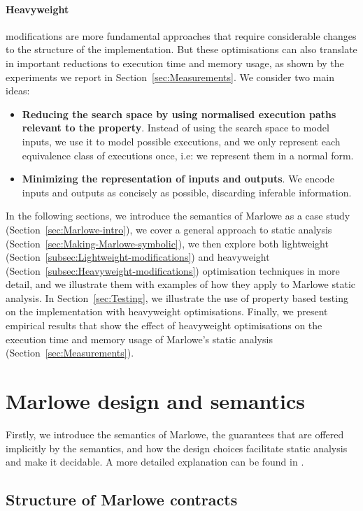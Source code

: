 \documentclass[english,runningheads]{llncs}
\begin{document}
\paragraph*{Heavyweight}

modifications are more fundamental approaches that require considerable
changes to the structure of the implementation. But these optimisations can also
translate in important reductions to execution time and memory usage, as
shown by the experiments we report in Section~\ref{sec:Measurements}.
We consider two main ideas:
\begin{itemize}
\item \textbf{Reducing the search space by using normalised execution paths relevant
to the property}. Instead of using the search space to model inputs, we
use it to model possible executions, and we only
represent each equivalence class of executions once, i.e:
we represent them in a normal form.
\item \textbf{Minimizing the representation of inputs and outputs}. We encode inputs
and outputs as concisely as possible, discarding inferable information.
\end{itemize}
In the following sections, we introduce the semantics of Marlowe as
a case study (Section~\ref{sec:Marlowe-intro}), we cover a
general approach to static analysis (Section~\ref{sec:Making-Marlowe-symbolic}),
we then explore both lightweight (Section~\ref{subsec:Lightweight-modifications})
and heavyweight (Section~\ref{subsec:Heavyweight-modifications})
optimisation techniques in more detail, and we illustrate them with
examples of how they apply to Marlowe static analysis. In Section~\ref{sec:Testing},
we illustrate the use of property based testing on the implementation with
heavyweight optimisations. Finally, we present empirical results that
show the effect of heavyweight optimisations on the execution time
and memory usage of Marlowe's static analysis (Section~\ref{sec:Measurements}).

\section{Marlowe design and semantics\label{sec:Marlowe-intro} }

Firstly, we introduce the semantics of Marlowe, the guarantees
that are offered implicitly by the semantics, and how the design choices
facilitate static analysis and make it decidable. A more detailed
explanation can be found in \cite{marlowe}.

\subsection{Structure of Marlowe contracts\label{subsec:Structure-of-Marlowe} }
\end{document}

